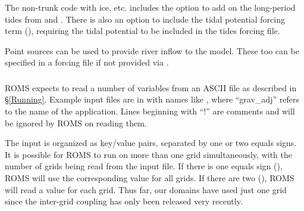 The non-trunk code with ice, etc. includes the  option to
add on the long-period tides from
\citet{Foreman_96a} and \citet{Foreman_96b}.
There is also an option to include the tidal potential
forcing term (), requiring the tidal potential to
be included in the tides forcing file.

\smallskip
{}

Point sources can be used to provide river inflow to the model.
These too can be specified in a forcing file if not provided via
.

\subsubsection{}
\label{ASCII_in}
ROMS expects to read a number of variables from an ASCII file as described
in \S\ref{Running}.
Example input files are in  with names like
, where ``grav\_adj'' refers to the name of
the application. Lines beginning with ``!'' are comments and will be
ignored by ROMS on reading them.

The input is organized as key/value pairs, separated by one or two
equals signs. It is possible for ROMS to run on more than one grid
simultaneously, with the number of grids being read from the input
file. If there is one equals sign (\code{=}), ROMS will use the
corresponding value for all grids. If there are two (\code{==}), ROMS
will read a value for each grid. Thus far, our domains have used just
one grid since the inter-grid coupling has only been released very
recently.

